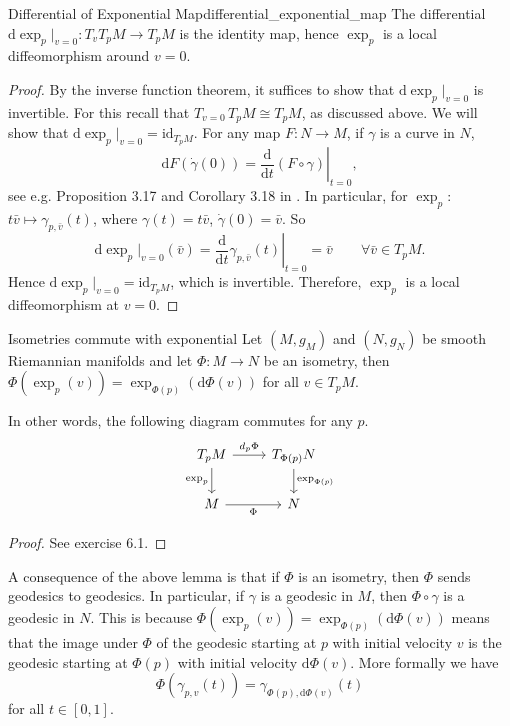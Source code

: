 \begin{colorlem}{Differential of Exponential Map}{differential_exponential_map}
The differential $\mathrm{d}\exp_p|_{v=0} : T_v T_p M \to T_p M$ is the identity map, hence $\exp_p$ is a local diffeomorphism around $v = 0$.
\end{colorlem}


\begin{proof}

By the inverse function theorem, it suffices to show that $\mathrm{d}\exp_p|_{v=0}$ is invertible. For this recall that $T_{v=0}\, T_p M \cong T_p M$, as discussed above. We will show that $\mathrm{d}\exp_p|_{v=0} = \mathrm{id}_{T_p M}$. For any map $F: N \to M$, if $\gamma$ is a curve in $N$,
\[
\mathrm{d}F(\dot{\gamma}(0)) = \left.\frac{\mathrm{d}}{\mathrm{d}t}(F \circ \gamma)\right|_{t=0},
\]
see e.g. Proposition 3.17 and Corollary 3.18 in \cite{tsakanikas2024dg2}. In particular, for $\exp_p$: $t\bar{v} \mapsto \gamma_{p,\bar{v}}(t)$, where $\gamma(t) = t\bar{v}$, $\dot{\gamma}(0) = \bar{v}$. So
\[
\mathrm{d}\exp_p|_{v=0}(\bar{v}) = \left.\frac{\mathrm{d}}{\mathrm{d}t}\gamma_{p,\bar{v}}(t)\right|_{t=0} = \bar{v} \qquad \forall \bar{v} \in T_p M.
\]
Hence $\mathrm{d}\exp_p\big|_{v=0}=\mathrm{id}_{T_pM}$, which is invertible. Therefore, \(\exp_p\) is a local diffeomorphism at \(v=0\).
\end{proof}


\begin{colorlem}{Isometries commute with exponential}{}
Let $(M,g_M)$ and $(N,g_N)$ be smooth Riemannian manifolds and let 
$\Phi : M \to N$ be an isometry, then $\Phi(\exp_p(v)) = \exp_{\Phi(p)}(\mathrm{d}\Phi(v))$ for all $v \in T_p M$. 
\end{colorlem}

In other words, the following diagram commutes for any $p$.
\[
\begin{tikzcd}
T_p M \arrow[r,"d_p \Phi"] \arrow[d,"\exp_p"'] & T_{\Phi(p)} N \arrow[d,"\exp_{\Phi(p)}"] \\
M \arrow[r,"\Phi"'] & N
\end{tikzcd}
\]

\begin{proof}
See exercise 6.1.
\end{proof}

A consequence of the above lemma is that if $\Phi$ is an isometry, then $\Phi$ sends geodesics to geodesics. In particular, if $\gamma$ is a geodesic in $M$, then $\Phi \circ \gamma$ is a geodesic in $N$. This is because $\Phi(\exp_p(v)) = \exp_{\Phi(p)}(\mathrm{d}\Phi(v))$ means that the image under $\Phi$ of the geodesic starting at $p$ with initial velocity $v$ is the geodesic starting at $\Phi(p)$ with initial velocity $\mathrm{d}\Phi(v)$. More formally we have
\begin{equation*}
    \Phi(\gamma_{p,v}(t)) = \gamma_{\Phi(p),\mathrm{d}\Phi(v)}(t)
\end{equation*}
for all $t \in [0,1]$.


